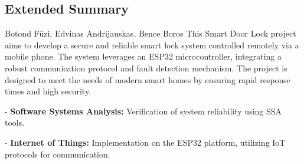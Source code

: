 \subsection*{Extended Summary}
Botond Füzi, Edvinas Andrijauskas, Bence Boros 
\newline
This Smart Door Lock project aims to develop a secure and reliable smart lock system controlled remotely via a mobile phone. The system leverages an ESP32 microcontroller, integrating a robust communication protocol and fault detection mechanism. The project is designed to meet the needs of modern smart homes by ensuring rapid response times and high security.

- \textbf{Software Systems Analysis:} Verification of system reliability using SSA tools.

- \textbf{Internet of Things:} Implementation on the ESP32 platform, utilizing IoT protocols for communication.